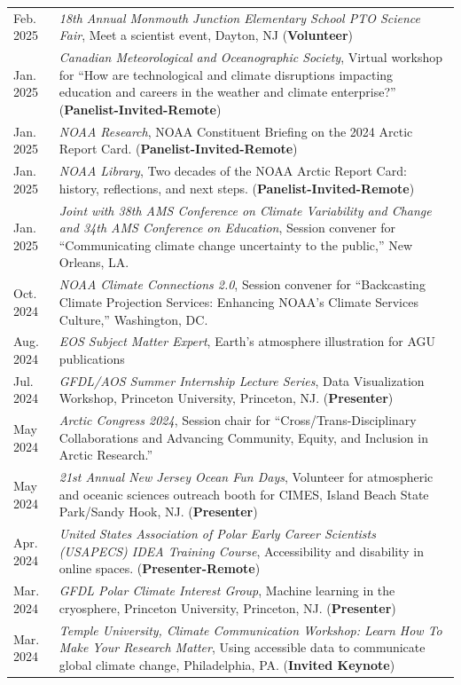 \documentclass[margin,line,palatino,courier,10pt]{res}
\begin{document}
\begin{resume}
\begin{tabular}{@{}p{0.9in}p{4in}}
Feb. 2025 & \textit{18th Annual Monmouth Junction Elementary School PTO Science Fair}, Meet a scientist event, Dayton, NJ (\textbf{Volunteer})\\
Jan. 2025 & \textit{Canadian Meteorological and Oceanographic Society}, Virtual workshop for ``How are technological and climate disruptions impacting education and careers in the weather and climate enterprise?'' (\textbf{Panelist-Invited-Remote})\\
Jan. 2025 & \textit{NOAA Research}, NOAA Constituent Briefing on the 2024 Arctic Report Card. (\textbf{Panelist-Invited-Remote})\\
Jan. 2025 & \textit{NOAA Library}, Two decades of the NOAA Arctic Report Card: history, reflections, and next steps. (\textbf{Panelist-Invited-Remote})\\
Jan. 2025 & \textit{Joint with 38th AMS Conference on Climate Variability and Change and 34th AMS Conference on Education}, Session convener for ``Communicating climate change uncertainty to the public,'' New Orleans, LA.\\ 
Oct. 2024 & \textit{NOAA Climate Connections 2.0}, Session convener for ``Backcasting Climate Projection Services: Enhancing NOAA’s Climate Services Culture,'' Washington, DC.\\ 
Aug. 2024 & \textit{EOS Subject Matter Expert}, Earth's atmosphere illustration for AGU publications\\
Jul. 2024 & \textit{GFDL/AOS Summer Internship Lecture Series}, Data Visualization Workshop, Princeton University, Princeton, NJ. (\textbf{Presenter})\\
May 2024 & \textit{Arctic Congress 2024}, Session chair for ``Cross/Trans-Disciplinary Collaborations and Advancing Community, Equity, and Inclusion in Arctic Research.''\\ 
May 2024 & \textit{21st Annual New Jersey Ocean Fun Days}, Volunteer for atmospheric and oceanic sciences outreach booth for CIMES, Island Beach State Park/Sandy Hook, NJ. (\textbf{Presenter})\\
Apr. 2024 & \textit{United States Association of Polar Early Career Scientists (USAPECS) IDEA Training Course}, Accessibility and disability in online spaces. (\textbf{Presenter-Remote})\\
Mar. 2024 & \textit{GFDL Polar Climate Interest Group}, Machine learning in the cryosphere, Princeton University, Princeton, NJ. (\textbf{Presenter})\\
Mar. 2024 & \textit{Temple University, Climate Communication Workshop: Learn How To Make Your Research Matter}, Using accessible data to communicate global climate change, Philadelphia, PA. (\textbf{Invited Keynote})\\

\end{tabular}
\end{resume}
\end{document}

